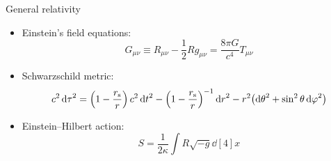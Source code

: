 \documentclass[aspectratio=169]{beamer}
\begin{document}
\begin{frame}{General relativity}
\begin{itemize}
  \item Einstein's field equations:
    \[ G_{\mu\nu} \equiv R_{\mu\nu} - \frac{1}{2} R g_{\mu\nu} = \frac{8\pi G}{c^4} T_{\mu\nu} \]
  \item Schwarzschild metric:
    \[
      c^2 \dd{\tau}^2 = \qty(1-\frac{r_{\mathrm{s}}}{r}) \, c^2 \dd{t}^2
                      - \qty(1-\frac{r_{\mathrm{s}}}{r})^{-1} \dd{r}^2
                      - r^2 \qty(\dd{\theta}^2 + \sin^2 \theta \dd{\varphi}^2)
    \]
  \item Einstein--Hilbert action:
    \[ S = \frac{1}{2\kappa} \int R \sqrt{-g} \dd[4]{x} \]
\end{itemize}
\end{frame}
\end{document}
